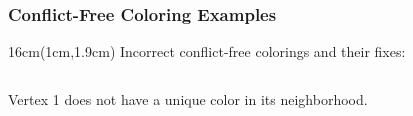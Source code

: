 \documentclass[xcolor=dvipsnames,aspectratio=1610]{beamer}
\newcommand{\exampleheight}{1.9cm}
\newcommand{\examplewidth}{16cm}
\begin{document}
\begin{frame}
  \end{frame}

  \begin{frame}
    \frametitle{Conflict-Free Coloring Examples}

    \begin{textblock*}{\examplewidth}(1cm,\exampleheight) %
      Incorrect conflict-free colorings and their fixes:
    \end{textblock*}

    \vspace{0.5cm}

    \pause

    \begin{columns}
      \begin{column}{0.33333\textwidth}


        \centering
        Vertex 1 does not have a unique color in its neighborhood.
      \end{column}

      \pause
      \pause

      \begin{column}{0.33333\textwidth}



\end{column}
\end{columns}
\end{frame}
\end{document}
